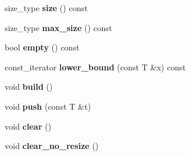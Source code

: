 \begin{DoxyCompactItemize}
\item 
\hypertarget{classlevelorder__vector_aa5aec8c6252e268b3f1b4fe2457b553c}{size\+\_\+type {\bfseries size} () const }\label{classlevelorder__vector_aa5aec8c6252e268b3f1b4fe2457b553c}

\item 
\hypertarget{classlevelorder__vector_a6f584af619e77dd5bdebf311f2d5b189}{size\+\_\+type {\bfseries max\+\_\+size} () const }\label{classlevelorder__vector_a6f584af619e77dd5bdebf311f2d5b189}

\item 
\hypertarget{classlevelorder__vector_a67cf39f7dfa8e8c139b320303ed93f3e}{bool {\bfseries empty} () const }\label{classlevelorder__vector_a67cf39f7dfa8e8c139b320303ed93f3e}

\item 
\hypertarget{classlevelorder__vector_a8c54c5e980c17dc0de64a046427ce275}{const\+\_\+iterator {\bfseries lower\+\_\+bound} (const T \&x) const }\label{classlevelorder__vector_a8c54c5e980c17dc0de64a046427ce275}

\item 
\hypertarget{classlevelorder__vector_a4cfb32f7ca9980d20a97b3ab910c257f}{void {\bfseries build} ()}\label{classlevelorder__vector_a4cfb32f7ca9980d20a97b3ab910c257f}

\item 
\hypertarget{classlevelorder__vector_a4bb13b1b043ed0a140fb4d356eb5aa9e}{void {\bfseries push} (const T \&t)}\label{classlevelorder__vector_a4bb13b1b043ed0a140fb4d356eb5aa9e}

\item 
\hypertarget{classlevelorder__vector_a6599405b77b76d01290b10df5f1f8c88}{void {\bfseries clear} ()}\label{classlevelorder__vector_a6599405b77b76d01290b10df5f1f8c88}

\item 
\hypertarget{classlevelorder__vector_aab03ef5b075e0ca1080d2db385234013}{void {\bfseries clear\+\_\+no\+\_\+resize} ()}\label{classlevelorder__vector_aab03ef5b075e0ca1080d2db385234013}

\end{DoxyCompactItemize}
